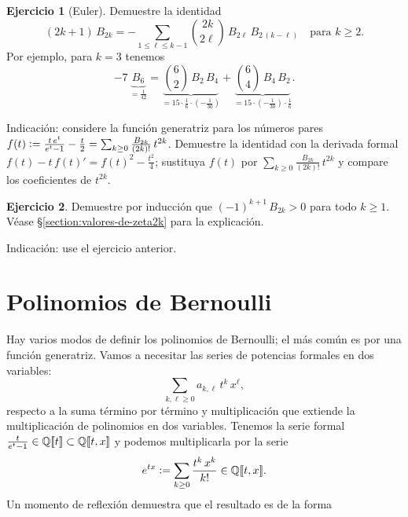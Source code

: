 \documentclass{article}
\numberwithin{equation}{section}
\theoremstyle{definition}
\newtheorem{ejercicio}{Ejercicio}
\begin{document}
\begin{ejercicio}[Euler]
  \label{ejercicio:identidad-de-Euler}
  Demuestre la identidad
  $$(2k + 1)\,B_{2k} = -\sum_{1 \le \ell \le k-1} {2k \choose 2\ell}\,B_{2\ell}\,B_{2\,(k-\ell)} \quad \text{para }k\ge 2.$$
  Por ejemplo, para $k = 3$ tenemos
  $$-7\,\underbrace{B_6}_{= \frac{1}{42}} =
  \underbrace{{6 \choose 2}\,B_2\,B_4}_{= 15\cdot \frac{1}{6}\cdot\left(-\frac{1}{30}\right)} + \underbrace{{6 \choose 4}\,B_4\,B_2}_{= 15\cdot\left(-\frac{1}{30}\right)\cdot \frac{1}{6}}.$$

  \vspace{1em}

  \noindent Indicación: considere la función generatriz para los números pares
  $f (t) \mathrel{\mathop:}= \frac{t\,e^t}{e^t - 1} - \frac{t}{2} = \sum_{k \ge 0}
  \frac{B_{2k}}{(2k)!}\,t^{2k}$. Demuestre la identidad con la derivada formal
  $f (t) - t\,f(t)' = f(t)^2 - \frac{t^2}{4}$; sustituya $f (t)$ por
  $\sum_{k \ge 0} \frac{B_{2k}}{(2k)!}\,t^{2k}$ y compare los coeficientes de
  $t^{2k}$.
\end{ejercicio}

\begin{ejercicio}
  \label{ejercicio:identidad-de-Euler-corolario}
  Demuestre por inducción que $(-1)^{k+1}\,B_{2k} > 0$ para todo
  $k \ge 1$. Véase \S\ref{section:valores-de-zeta2k} para la explicación.

  \noindent Indicación: use el ejercicio anterior.
\end{ejercicio}


\section{Polinomios de Bernoulli}

Hay varios modos de definir los polinomios de Bernoulli; el más común es por una
función generatriz. Vamos a necesitar las series de potencias formales en dos
variables:
$$\sum_{k, \ell \ge 0} a_{k,\ell} \, t^k \, x^\ell,$$
respecto a la suma término por término y multiplicación que extiende
la multiplicación de polinomios en dos variables. Tenemos la serie formal
$\frac{t}{e^t - 1} \in \mathbb{Q} [\![t]\!] \subset \mathbb{Q} [\![t,x]\!]$ y podemos
multiplicarla por la serie
$$e^{tx} \mathrel{\mathop:}= \sum_{k \ge 0} \frac{t^k\,x^k}{k!} \in \mathbb{Q} [\![t,x]\!].$$
Un momento de reflexión demuestra que el resultado es de la forma
\end{document}
